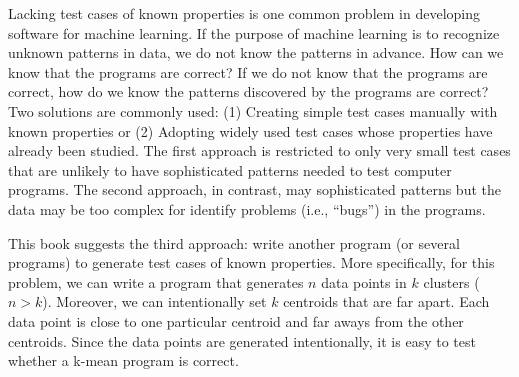 Lacking test cases of known properties is one common problem in
developing software for machine learning.  If the purpose of machine
learning is to recognize unknown patterns in data, we do not know the
patterns in advance.  How can we know that the programs are correct?
If we do not know that the programs are correct, how do we know the
patterns discovered by the programs are correct?  Two solutions are
commonly used: (1) Creating simple test cases manually with known
properties or (2) Adopting widely used test cases whose properties
have already been studied. The first approach is restricted to only
very small test cases that are unlikely to have sophisticated patterns
needed to test computer programs.  The second approach, in contrast,
may sophisticated patterns but the data may be too complex for
identify problems (i.e., ``bugs'') in the programs.

This book suggests the third approach: write another program (or
several programs) to generate test cases of known properties.  More
specifically, for this problem, we can write a program that generates
$n$ data points in $k$ clusters ($n > k$). Moreover, we can
intentionally set $k$ centroids that are far apart. Each data point is
close to one particular centroid and far aways from the other
centroids.  Since the data points are generated intentionally, it is
easy to test whether a k-mean program is correct.
   
